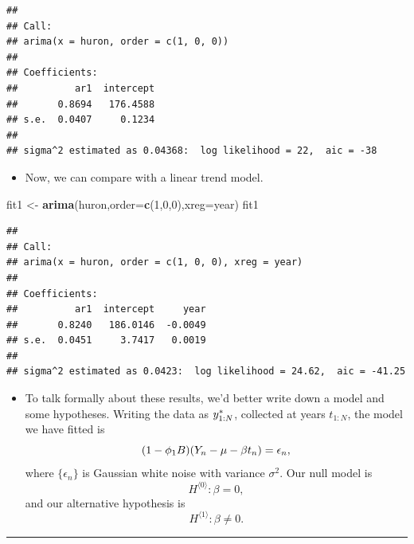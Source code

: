 \documentclass[]{article}
\newenvironment{Shaded}{\begin{snugshade}}{\end{snugshade}}
\newcommand{\KeywordTok}[1]{\textcolor[rgb]{0.13,0.29,0.53}{\textbf{#1}}}
\newcommand{\DataTypeTok}[1]{\textcolor[rgb]{0.13,0.29,0.53}{#1}}
\newcommand{\DecValTok}[1]{\textcolor[rgb]{0.00,0.00,0.81}{#1}}
\newcommand{\StringTok}[1]{\textcolor[rgb]{0.31,0.60,0.02}{#1}}
\newcommand{\NormalTok}[1]{#1}
\providecommand{\tightlist}{%
  \setlength{\itemsep}{0pt}\setlength{\parskip}{0pt}}
\begin{document}
\begin{verbatim}
## 
## Call:
## arima(x = huron, order = c(1, 0, 0))
## 
## Coefficients:
##          ar1  intercept
##       0.8694   176.4588
## s.e.  0.0407     0.1234
## 
## sigma^2 estimated as 0.04368:  log likelihood = 22,  aic = -38
\end{verbatim}

\begin{itemize}
\tightlist
\item
  Now, we can compare with a linear trend model.
\end{itemize}

\begin{Shaded}
\begin{Highlighting}[]
\NormalTok{fit1 <-}\StringTok{ }\KeywordTok{arima}\NormalTok{(huron,}\DataTypeTok{order=}\KeywordTok{c}\NormalTok{(}\DecValTok{1}\NormalTok{,}\DecValTok{0}\NormalTok{,}\DecValTok{0}\NormalTok{),}\DataTypeTok{xreg=}\NormalTok{year)}
\NormalTok{fit1}
\end{Highlighting}
\end{Shaded}

\begin{verbatim}
## 
## Call:
## arima(x = huron, order = c(1, 0, 0), xreg = year)
## 
## Coefficients:
##          ar1  intercept     year
##       0.8240   186.0146  -0.0049
## s.e.  0.0451     3.7417   0.0019
## 
## sigma^2 estimated as 0.0423:  log likelihood = 24.62,  aic = -41.25
\end{verbatim}
\begin{itemize}
\tightlist
\item
  To talk formally about these results, we'd better write down a model
  and some hypotheses. Writing the data as \(y_{1:N}^*\), collected
  at years \(t_{1:N}\), the model we have fitted is
  \[ (1-\phi_1 B)(Y_n - \mu - \beta t_n) = \epsilon_n,\] 
  where
  \(\{\epsilon_n\}\) is Gaussian white noise with variance \(\sigma^2\).
  Our null model is \[ H^{\langle 0\rangle}: \beta=0,\] and our
  alternative hypothesis is \[ H^{\langle 1\rangle}: \beta\neq 0.\]
\end{itemize}

\begin{center}\rule{0.5\linewidth}{\linethickness}\end{center}
\end{document}
